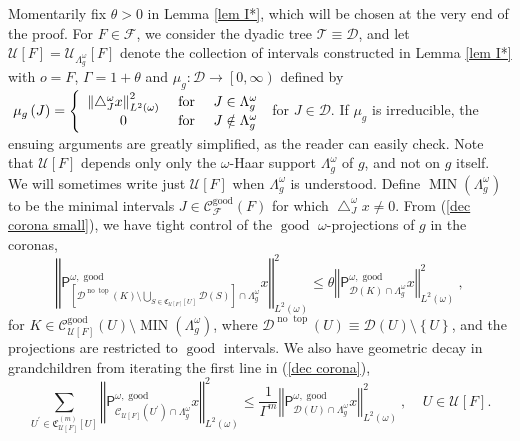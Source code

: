 \documentclass{amsart}%
\theoremstyle{plain}
\numberwithin{equation}{section}
\begin{document}
Momentarily fix $\theta>0$ in Lemma \ref{lem I*}, which will be chosen at the
very end of the proof. For $F\in\mathcal{F}$, we consider the dyadic tree
$\mathcal{T}\equiv\mathcal{D}$, and let $\mathcal{U}\left[  F\right]
=\mathcal{U}_{\Lambda_{g}^{\omega}}\left[  F\right]  $ denote the collection
of intervals constructed in Lemma \ref{lem I*} with $o=F$, $\Gamma=1+\theta$
and $\mu_{g}:\mathcal{D}\rightarrow\left[  0,\infty\right)  $ defined
by$\ \mu_{g}\left(  J\right)  =\left\{
\begin{array}
[c]{ccc}%
\left\Vert \bigtriangleup_{J}^{\omega}x\right\Vert _{L^{2}\left(
\omega\right)  }^{2} & \text{ for } & J\in\Lambda_{g}^{\omega}\\
0 & \text{ for } & J\notin\Lambda_{g}^{\omega}%
\end{array}
\right.  $ for $J\in\mathcal{D}$. If $\mu_{g}$ is irreducible, the ensuing
arguments are greatly simplified, as the reader can easily check. Note that
$\mathcal{U}\left[  F\right]  $ depends only only the $\omega$-Haar support
$\Lambda_{g}^{\omega}$ of $g$, and not on $g$ itself. We will sometimes write
just $\mathcal{U}\left[  F\right]  $ when $\Lambda_{g}^{\omega}$ is
understood. Define $\operatorname{MIN}\left(  \Lambda_{g}^{\omega}\right)  $
to be the minimal intervals $J\in\mathcal{C}_{\mathcal{F}}%
^{\operatorname{good}}\left(  F\right)  $ for which $\bigtriangleup
_{J}^{\omega}x\neq0$. From (\ref{dec corona small}), we have tight control of
the $\operatorname{good}$ $\omega$-projections of $g$ in the coronas,%
\begin{equation}
\left\Vert \mathsf{P}_{\left[  \mathcal{D}^{\operatorname*{no}%
\operatorname{top}}\left(  K\right)  \setminus\bigcup_{S\in\mathfrak{C}%
_{\mathcal{U}\left[  F\right]  }\left[  U\right]  }\mathcal{D}\left(
S\right)  \right]  \cap\Lambda_{g}^{\omega}}^{\omega,\operatorname{good}%
}x\right\Vert _{L^{2}\left(  \omega\right)  }^{2}\leq\theta\left\Vert
\mathsf{P}_{\mathcal{D}\left(  K\right)  \cap\Lambda_{g}^{\omega}}%
^{\omega,\operatorname{good}}x\right\Vert _{L^{2}\left(  \omega\right)  }%
^{2}\ ,\label{tight}%
\end{equation}
for $K\in\mathcal{C}_{\mathcal{U}\left[  F\right]  }^{\operatorname{good}%
}\left(  U\right)  \setminus\operatorname{MIN}\left(  \Lambda_{g}^{\omega
}\right)  $, where $\mathcal{D}^{\operatorname*{no}\operatorname{top}}\left(
U\right)  \equiv\mathcal{D}\left(  U\right)  \setminus\left\{  U\right\}  $,
and the projections are restricted to $\operatorname{good}$ intervals. We also
have geometric decay in grandchildren from iterating the first line in
(\ref{dec corona}),%
\begin{equation}
\sum_{U^{\prime}\in\mathfrak{C}_{\mathcal{U}\left[  F\right]  }^{\left(
m\right)  }\left[  U\right]  }\left\Vert \mathsf{P}_{\mathcal{C}%
_{\mathcal{U}\left[  F\right]  }\left(  U^{\prime}\right)  \cap\Lambda
_{g}^{\omega}}^{\omega,\operatorname{good}}x\right\Vert _{L^{2}\left(
\omega\right)  }^{2}\leq\frac{1}{\Gamma^{m}}\left\Vert \mathsf{P}%
_{\mathcal{D}\left(  U\right)  \cap\Lambda_{g}^{\omega}}^{\omega
,\operatorname{good}}x\right\Vert _{L^{2}\left(  \omega\right)  }%
^{2}\ ,\ \ \ \ \ U\in\mathcal{U}\left[  F\right]  .\label{geo dec}%
\end{equation}
\end{document}
